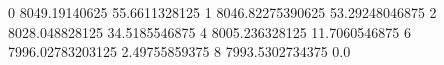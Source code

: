 0 8049.19140625 55.6611328125
1 8046.82275390625 53.29248046875
2 8028.048828125 34.5185546875
4 8005.236328125 11.7060546875
6 7996.02783203125 2.49755859375
8 7993.5302734375 0.0

